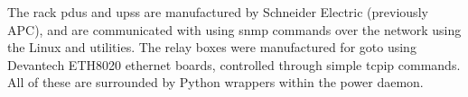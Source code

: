 \begin{colsection}
\begin{colsection}
The rack \glspl{pdu} and \glspl{ups} are manufactured by Schneider Electric (previously APC), and are communicated with using \gls{snmp} commands over the network using the Linux  and  utilities. The relay boxes were manufactured for \gls{goto} using Devantech ETH8020 ethernet boards, controlled through simple \gls{tcpip} commands. All of these are surrounded by Python wrappers within the power daemon.

\end{colsection}


\end{colsection}

